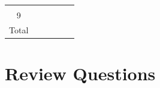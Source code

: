 \documentclass[]{book}
\theoremstyle{definition}
\theoremstyle{definition}
\theoremstyle{definition}
\theoremstyle{remark}
\begin{document}
\begin{longtable}[]{@{}clllll@{}}
\begin{minipage}[t]{0.19\columnwidth}
\strut
\end{minipage} & \begin{minipage}[t]{0.04\columnwidth}\raggedright\strut
\strut
\end{minipage}\tabularnewline
\begin{minipage}[t]{0.05\columnwidth}\centering\strut
9\strut
\end{minipage} & \begin{minipage}[t]{0.19\columnwidth}\raggedright\strut
\strut
\end{minipage} & \begin{minipage}[t]{0.19\columnwidth}\raggedright\strut
\strut
\end{minipage} & \begin{minipage}[t]{0.19\columnwidth}\raggedright\strut
\strut
\end{minipage} & \begin{minipage}[t]{0.19\columnwidth}\raggedright\strut
\strut
\end{minipage} & \begin{minipage}[t]{0.04\columnwidth}\raggedright\strut
\strut
\end{minipage}\tabularnewline
\begin{minipage}[t]{0.05\columnwidth}\centering\strut
Total\strut
\end{minipage} & \begin{minipage}[t]{0.19\columnwidth}\raggedright\strut
\strut
\end{minipage} & \begin{minipage}[t]{0.19\columnwidth}\raggedright\strut
\strut
\end{minipage} & \begin{minipage}[t]{0.19\columnwidth}\raggedright\strut
\strut
\end{minipage} & \begin{minipage}[t]{0.19\columnwidth}\raggedright\strut
\strut
\end{minipage} & \begin{minipage}[t]{0.04\columnwidth}\raggedright\strut
\strut
\end{minipage}\tabularnewline
\bottomrule
\end{longtable}

\section{Review Questions}\label{review-questions-2}
\end{document}
